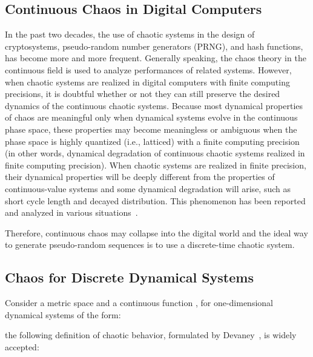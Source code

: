 \documentclass[journal]{IEEEtran}
\begin{document}
\subsection{Continuous Chaos in Digital Computers}

In the past two decades, the use of chaotic systems in the design of cryptosystems, pseudo-random number generators (PRNG), and hash functions, has become more and more frequent.
Generally speaking, the chaos theory in the continuous field is used to analyze performances of related systems. However, when chaotic systems are realized in digital computers with finite computing precisions, it is doubtful whether or not they can still preserve the desired dynamics of the continuous chaotic systems. Because most dynamical properties of chaos are meaningful only when dynamical systems evolve in the continuous phase space, these properties may become meaningless or ambiguous when the phase space is highly quantized (i.e., latticed) with a finite computing precision (in other words, dynamical degradation of continuous chaotic systems realized
in finite computing precision). When chaotic systems are realized in finite precision, their dynamical properties will be deeply different from the properties of continuous-value systems and some dynamical degradation will arise, such as short cycle length and decayed distribution. This phenomenon has been reported and analyzed in various situations~\cite{Binder1986,Wheeler1989,Palmore1990,Blank1997,Li2005}.


Therefore, continuous chaos may collapse into the digital world and the ideal way to generate pseudo-random sequences is to use a discrete-time chaotic system.




\subsection{Chaos for Discrete Dynamical Systems}

Consider a metric space  and a continuous function , for one-dimensional dynamical systems of the form:

the following definition of chaotic behavior, formulated by Devaney~\cite{Dev89}, is widely accepted:
\end{document}
